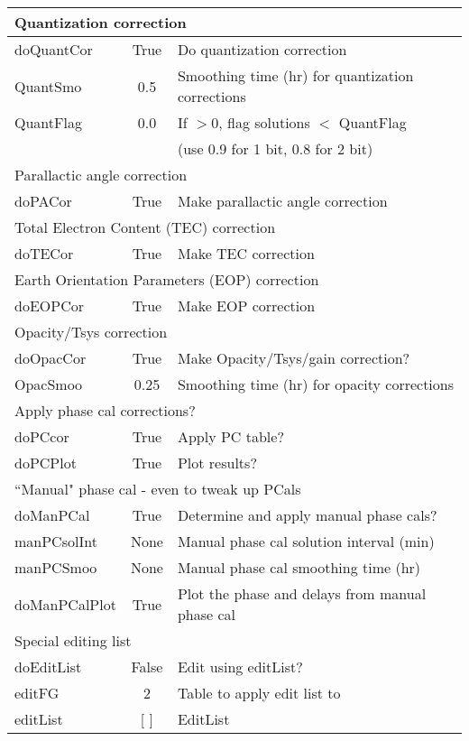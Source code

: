\documentclass[11pt]{article}
\begin{document}
\vfill
\begin{center}
\begin{tabular}{|l|c|l|}

\hline
\multicolumn{3}{|l|}{Quantization correction} \\
\hline
doQuantCor & True & Do quantization correction \\
QuantSmo & 0.5 & Smoothing time (hr) for quantization corrections \\
QuantFlag & 0.0 & If $>$0, flag solutions $<$ QuantFlag \\
 & & (use 0.9 for 1 bit, 0.8 for 2 bit) \\

\hline
\multicolumn{3}{|l|}{Parallactic angle correction} \\
\hline
doPACor & True & Make parallactic angle correction \\

\hline
\multicolumn{3}{|l|}{Total Electron Content (TEC) correction} \\
\hline
doTECor & True & Make TEC correction \\

\hline
\multicolumn{3}{|l|}{Earth Orientation Parameters (EOP) correction} \\
\hline
doEOPCor & True & Make EOP correction \\

\hline
\multicolumn{3}{|l|}{Opacity/Tsys correction} \\
\hline
doOpacCor & True & Make Opacity/Tsys/gain correction? \\
OpacSmoo & 0.25 & Smoothing time (hr) for opacity corrections \\

\hline
\multicolumn{3}{|l|}{Apply phase cal corrections?} \\
\hline
doPCcor & True & Apply PC table? \\
doPCPlot & True & Plot results? \\
\hline
\multicolumn{3}{|l|}{``Manual" phase cal - even to tweak up PCals} \\
\hline
doManPCal & True & Determine and apply manual phase cals? \\
manPCsolInt & None & Manual phase cal solution interval (min) \\
manPCSmoo & None & Manual phase cal smoothing time (hr) \\
doManPCalPlot & True & Plot the phase and delays from manual phase cal \\

\hline
\multicolumn{3}{|l|}{Special editing list} \\
\hline
doEditList & False & Edit using editList? \\
editFG & 2 & Table to apply edit list to \\
editList & [ ] & EditList \\

\hline
\end{tabular}
\end{center}
\end{document}
